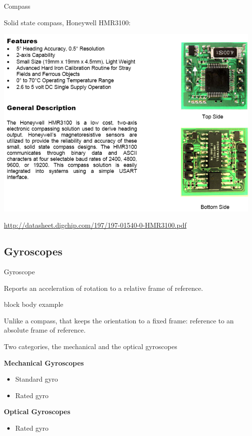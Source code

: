 \documentclass[compress]{beamer}
\begin{document}
\begin{frame}{Compass}

  Solid state compass, \eg Honeywell HMR3100:

    \begin{center}
        \includegraphics[width=0.8\linewidth]{compass}
    \end{center}
\small
\url{http://datasheet.digchip.com/197/197-01540-0-HMR3100.pdf}

\end{frame}

\subsection{Gyroscopes}

\begin{frame}{Gyroscope}

    Reports an acceleration of rotation to a relative frame of reference.

    \begin{beamercolorbox}{block body example}

        Unlike a compass, that keeps the orientation to a fixed frame: reference to an
        absolute frame of reference.

    \end{beamercolorbox}

    Two categories, the mechanical and the optical gyroscopes

    {\bf Mechanical Gyroscopes}

    \begin{itemize}

        \item Standard gyro
        \item Rated gyro
    \end{itemize}

    {\bf Optical Gyroscopes}

    \begin{itemize}

        \item Rated gyro
    \end{itemize}

\end{frame}
\end{document}
